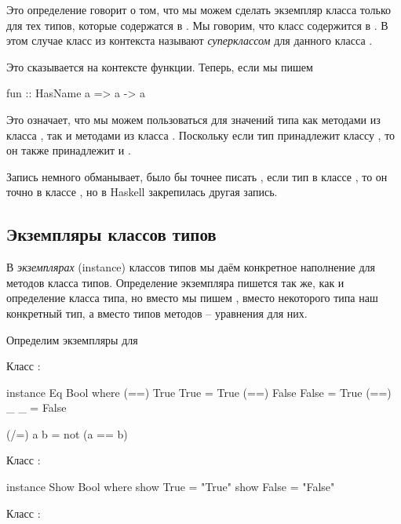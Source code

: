Это определение говорит о том, что мы можем сделать 
экземпляр класса  
только для тех типов, которые содержатся в .
Мы говорим, что класс  содержится в .
В этом случае класс из контекста  
называют 
\emph{суперклассом} для данного класса .

Это сказывается на контексте функции. Теперь, если мы пишем


\begin{code}
fun :: HasName a => a -> a
\end{code}


Это означает, что мы можем пользоваться для значений типа
 как методами из класса , так и методами 
из класса . Поскольку если тип принадлежит 
классу , то он также принадлежит и . 

Запись  немного обманывает, было бы точнее 
писать , если тип  в классе , то 
он точно в классе , но в Haskell  закрепилась другая запись.

\subsection{Экземпляры классов типов}

В 
\emph{экземплярах} (instance) классов типов мы даём конкретное
наполнение для методов класса типов. Определение экземпляра
пишется так же, как и определение класса типа, но вместо 
мы пишем  , вместо некоторого типа наш конкретный
тип, а вместо типов методов -- уравнения для них. 

Определим экземпляры для 

Класс :

\begin{code}
instance Eq Bool where
    (==) True  True  = True
    (==) False False = True
    (==) _     _     = False

    (/=) a b         = not (a == b)
\end{code}


Класс :

\begin{code}
instance Show Bool where
    show True  = "True"
    show False = "False"
\end{code}

Класс :

